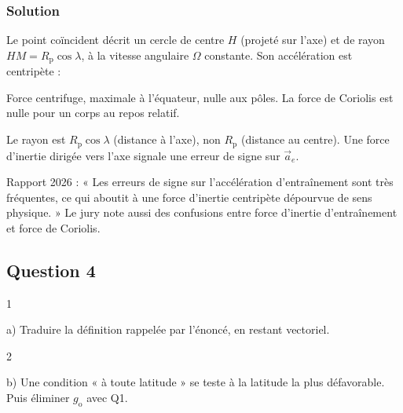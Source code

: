 \documentclass[11pt,a4paper]{article}
\newcommand{\equationajustee}[1]{%
  \sbox{\boiteequation}{$\displaystyle #1$}%
  \ifdim\wd\boiteequation>\linewidth
    \[\resizebox{\linewidth}{!}{\usebox{\boiteequation}}\]%
  \else
    \[#1\]%
  \fi}
\begin{document}
\hypertarget{solution-2}{%
\subsubsection{Solution}\label{solution-2}}

Le point coïncident décrit un cercle de centre \(H\) (projeté sur l'axe) et de rayon \(HM=R_{\mathrm{p}}\cos\lambda\), à la vitesse angulaire \(\Omega\) constante. Son accélération est centripète :

\equationajustee{\vec a_e=-\Omega^2\,\overrightarrow{HM}=-\Omega^2R_{\mathrm{p}}\cos\lambda\,\vec u}

\equationajustee{\boxed{\vec F_{ie}=-m\vec a_e=m\Omega^2R_{\mathrm{p}}\cos\lambda\;\vec u}}

Force centrifuge, maximale à l'équateur, nulle aux pôles. La force de Coriolis est nulle pour un corps au repos relatif.

\begin{piege}

Le rayon est \(R_{\mathrm{p}}\cos\lambda\) (distance à l'axe), non \(R_{\mathrm{p}}\) (distance au centre). Une force d'inertie dirigée vers l'axe signale une erreur de signe sur \(\vec a_e\).

\end{piege}

\begin{jury}

Rapport 2026 : « Les erreurs de signe sur l'accélération d'entraînement sont très fréquentes, ce qui aboutit à une force d'inertie centripète dépourvue de sens physique. » Le jury note aussi des confusions entre force d'inertie d'entraînement et force de Coriolis.

\end{jury}

\hypertarget{question-4}{%
\subsection{Question 4}\label{question-4}}

\begin{indication}{1}

a) Traduire la définition rappelée par l'énoncé, en restant vectoriel.

\end{indication}

\begin{indication}{2}

b) Une condition « à toute latitude » se teste à la latitude la plus défavorable. Puis éliminer \(g_{\mathrm{o}}\) avec Q1.

\end{indication}
\end{document}
